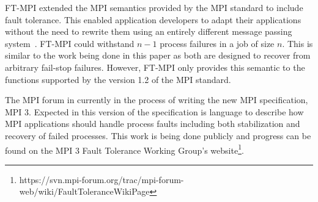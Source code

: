\documentclass{llncs}
\newcommand{\ompi}{Open\,MPI\xspace}
\begin{document}

FT-MPI extended the MPI semantics provided by the MPI standard to
include fault tolerance. This enabled application developers to adapt
their applications without the need to rewrite them using an entirely
different message passing
system~\cite{Fagg:2000:FFT:648137.746632,Fagg:2004vd}. FT-MPI could
withstand $n-1$ process failures in a job of size $n$. This is similar
to the work being done in this paper as both are designed to recover
from arbitrary fail-stop failures. However, FT-MPI only provides this
semantic to the functions supported by the version 1.2 of the MPI
standard.



The MPI forum in currently in the process of writing the new MPI
specification, MPI 3. Expected in this version of the specification is
language to describe how MPI applications should handle process faults
including both stabilization and recovery of failed processes. This
work is being done publicly and progress can be found on the MPI 3
Fault Tolerance Working Group's
website\footnote{https://svn.mpi-forum.org/trac/mpi-forum-web/wiki/FaultToleranceWikiPage}.




\end{document}
